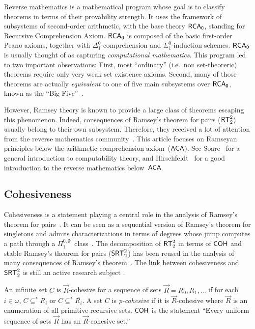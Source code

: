 
Reverse mathematics is a mathematical program whose goal is
to classify theorems in terms of their provability strength.
It uses the framework of subsystems of second-order arithmetic,
with the base theory $\operatorname{\sf{RCA}_0}$, standing for Recursive Comprehension Axiom.
$\operatorname{\sf{RCA}_0}$ is composed of the basic first-order Peano axioms,
together with $\Delta^0_1$-comprehension and $\Sigma^0_1$-induction schemes.
$\operatorname{\sf{RCA}_0}$ is usually thought of as capturing \emph{computational mathematics}.
This program led to two important observations:
First, most ``ordinary'' (i.e.\ non set-theoreric) theorems require only very weak set existence axioms.
Second, many of those theorems are actually \emph{equivalent}
to one of five main subsystems over $\operatorname{\sf{RCA}_0}$, known as the ``Big Five''~\cite{Montalban2011Open}.

However, Ramsey theory is known to provide a large class of theorems escaping this phenomenon.
Indeed, consequences of Ramsey's theorem for pairs ($\operatorname{\sf{RT}}^2_2$) usually belong to their own subsystem.
Therefore, they received a lot of attention from the reverse mathematics 
community~\cite{Cholak2001strength,Hirschfeldt2008strength,Hirschfeldt2007Combinatorial,Seetapun1995strength}.
This article focuses on Ramseyan principles below the arithmetic comprehension axiom~($\operatorname{\sf{ACA}}$). 
See Soare~\cite{Soare2016Turing} for a general introduction to computability theory,
and Hirschfeldt~\cite{Hirschfeldt2015Slicing} for a good introduction
to the reverse mathematics below~$\operatorname{\sf{ACA}}$.

\subsection{Cohesiveness}

Cohesiveness is a statement playing a central role in the analysis of Ramsey's theorem for pairs~\cite{Cholak2001strength}.
It can be seen as a sequential version of Ramsey's theorem for singletons and admits
characterizations in terms of degrees whose jump computes a path through a $\Pi^{0,\emptyset'}_1$ class~\cite{Jockusch1993cohesive}.
The decomposition of $\operatorname{\sf{RT}}^2_2$ in terms of $\operatorname{\sf{COH}}$ and stable Ramsey's theorem for pairs ($\operatorname{\sf{SRT}}^2_2$)
has been reused in the analysis of many consequences of Ramsey's theorem~\cite{Hirschfeldt2007Combinatorial}.
The link between cohesiveness and~$\operatorname{\sf{SRT}}^2_2$ is still an active research subject
\cite{Chong2014metamathematics,DzhafarovStrong,Hirschfeldt2016notions,Patey2016weakness}.

\begin{definition}[Cohesiveness]
An infinite set $C$ is $\vec{R}$-cohesive for a sequence of sets $\vec{R} = R_0, R_1, \dots$
if for each $i \in \omega$, $C \subseteq^{*} R_i$ or $C \subseteq^{*} \overline{R_i}$.
A set $C$ is \emph{p-cohesive} if it is $\vec{R}$-cohesive where
$\vec{R}$ is an enumeration of all primitive recursive sets.
$\operatorname{\sf{COH}}$ is the statement ``Every uniform sequence of sets $\vec{R}$
has an $\vec{R}$-cohesive set.''
\end{definition}

